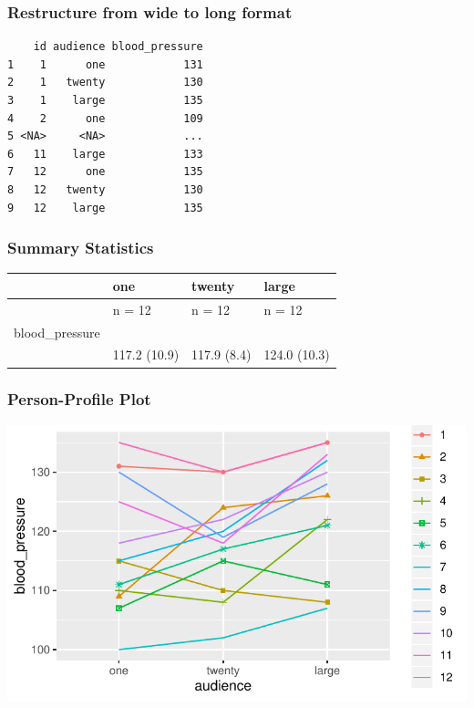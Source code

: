 \documentclass[
]{article}
\begin{document}
\hypertarget{restructure-from-wide-to-long-format-2}{%
\subsubsection{Restructure from wide to long
format}\label{restructure-from-wide-to-long-format-2}}

\begin{verbatim}
    id audience blood_pressure
1    1      one            131
2    1   twenty            130
3    1    large            135
4    2      one            109
5 <NA>     <NA>            ...
6   11    large            133
7   12      one            135
8   12   twenty            130
9   12    large            135
\end{verbatim}

\clearpage

\hypertarget{summary-statistics}{%
\subsubsection{Summary Statistics}\label{summary-statistics}}

\begin{longtable}[]{@{}llll@{}}
\toprule
& one & twenty & large\tabularnewline
\midrule
\endhead
& n = 12 & n = 12 & n = 12\tabularnewline
blood\_pressure & & &\tabularnewline
& 117.2 (10.9) & 117.9 (8.4) & 124.0 (10.3)\tabularnewline
\bottomrule
\end{longtable}

\hypertarget{person-profile-plot-2}{%
\subsubsection{Person-Profile Plot}\label{person-profile-plot-2}}

\begin{center}\includegraphics{Chapter-15-Assignment-R-Skeleton--2020spring_files/figure-latex/unnamed-chunk-11-1} \end{center}
\end{document}
